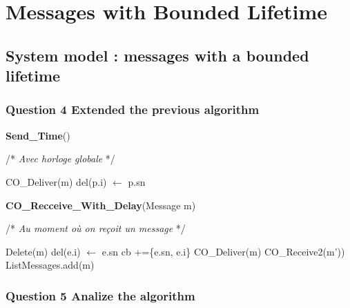 \chapter{Messages with Bounded Lifetime}

\section{System model : messages with a bounded lifetime}

\subsection{Question 4 Extended the previous algorithm}
\begin{algorithm}
\caption{\textbf{Send\_Time}()}
/* \textit{ Avec horloge globale} */
\label{algo:Q4a}
\begin{algorithmic}[1]
      \STATE  CO\_Deliver(m)
   \STATE  del(p.i) $\leftarrow$ p.sn
   \ENDIF
   \ENDFOR
  \ENDIF
\end{algorithmic}
\end{algorithm}


\begin{algorithm}
\caption{\textbf{CO\_Recceive\_With\_Delay}(Message m)}
/* \textit{ Au moment où on reçoit un message} */
\label{algo:Q4b}
\begin{algorithmic}[1]
  \STATE Delete(m)
   \STATE  del(e.i) $\leftarrow$ e.sn
     \STATE  cb +=\{e.sn, e.i\}
     \STATE  CO\_Deliver(m)
     \STATE    CO\_Receive2(m'))
       \ENDFOR
       \ELSE
       \STATE ListMessages.add(m)
       \ENDIF
\end{algorithmic}
\end{algorithm}


\subsection{Question 5 Analize the algorithm}

